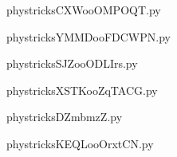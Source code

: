 
    \newcommand{\CaptionFigCXWooOMPOQT}{<+Type your caption here+>}
    \begin{center}
        
    \end{center}
    phystricksCXWooOMPOQT.py

    

    \clearpage
    


    \newcommand{\CaptionFigYMMDooFDCWPN}{<+Type your caption here+>}
    \begin{center}
        
    \end{center}
    phystricksYMMDooFDCWPN.py

    

    \clearpage
    


    \newcommand{\CaptionFigSJZooODLIrs}{<+Type your caption here+>}
    \begin{center}
        
    \end{center}
    phystricksSJZooODLIrs.py

    

    \clearpage
    


    \newcommand{\CaptionFigXSTKooZqTACG}{<+Type your caption here+>}
    \begin{center}
        
    \end{center}
    phystricksXSTKooZqTACG.py

    

    \clearpage
    


    \newcommand{\CaptionFigDZmbmzZ}{<+Type your caption here+>}
    \begin{center}
        
    \end{center}
    phystricksDZmbmzZ.py

    

    \clearpage
    


    \newcommand{\CaptionFigKEQLooOrxtCN}{<+Type your caption here+>}
    \begin{center}
        
    \end{center}
    phystricksKEQLooOrxtCN.py

